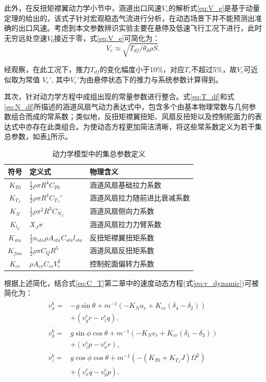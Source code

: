 此外，在反扭矩襟翼动力学小节中，涵道出口风速$V_e$的解析式\eqref{eq:V_e}是基于动量定理的给出的，该式子针对宏观稳态气流进行分析，在动态场景下并不能预测出准确的出口风速。考虑到本文参数辨识实验主要在悬停及低速飞行工况下进行，此时无穷远处空速$V_0$接近于零，式\eqref{eq:V_e}可简化为：
\begin{equation}
    V_e \approx \sqrt{T_{df}/\theta _d \rho S}.
\end{equation}

经观察，在此工况下，推力$T_{df}$的变化幅度小于10\%，对应$T_e$不超过5\%，故$V_e$可近似取为常值 $V_e'$, 其中$V_e'$为由悬停状态下的推力与系统参数计算得到。

其次，针对动力学方程中成组出现的常量参数进行整合。式\eqref{eq:T_df}和式\eqref{eq:N_df}所描述的涵道风扇气动力表达式中，包含多个由基本物理常数与几何参数组合而成的常系数；类似地，反扭矩襟翼扭矩、风扇反扭矩以及控制舵面力的表达式中亦存在此类组合。为使动态方程更加简洁清晰，将这些常系数定义为若干集总参数，如表\ref{tab:lumped_parameters}所示。

\begin{table}[htbp]
\centering
\caption{\label{tab:lumped_parameters}动力学模型中的集总参数定义}
\begin{tabular}{cll}
\toprule
符号 & 定义式 & 物理含义 \tabularnewline
\midrule
$K_{T0}$ & $ \frac{1}{2}\rho \pi R^4 C_{T0}$ \hfill & 涵道风扇基础拉力系数 \tabularnewline
$K_{T_J}$ & $ \frac{1}{2}\rho \pi R^4 C_{T_J}'$ \hfill & 涵道风扇拉力随前进比衰减系数 \tabularnewline
$K_{N}$ & $ \frac{1}{2}\rho \pi^2 R^3 C_{N_J}$ \hfill & 涵道风扇侧向力系数 \tabularnewline
$K_{l_T}$ & $ X_J \pi$ \hfill & 涵道风扇拉力力臂系数 \tabularnewline
$K_{sta}$ & $ \frac{1}{2} n_{sta} \rho A_{sta} C_{sta} l_{sta}$ \hfill & 反扭矩襟翼扭矩系数 \tabularnewline
$K_{fan}$ & $ \frac{1}{2}\rho \pi C_Q R^5$ \hfill & 涵道风扇反扭矩系数 \tabularnewline
$K_{cv}$ & $ \rho A_{cv} C_{cv} V_e^2$ \hfill & 控制舵面偏转力系数 \tabularnewline
\bottomrule
\end{tabular}
\end{table}

根据上述简化，结合式\eqref{eq:C_T}第二章中的速度动态方程(式\eqref{eq:v_dynamic})可被简化为：
\begin{equation}
    \begin{aligned}
        \dot{v_x^b} =& -g\sin\theta + m^{-1}(-K_{N} u_r + K_{cv} (\delta_4 - \delta_2)) \\
        &+ (v_y^e r - v_z^e q), \\
        \dot{v_y^b} =& g\sin\phi\cos\theta + m^{-1}(-K_{N} v_r + K_{cv} (\delta_1 - \delta_3)) \\
        &+ (v_z^e p - v_x^e r), \\
        \dot{v_z^b} =& g\cos\phi\cos\theta + m^{-1}(-(K_{T0} + K_{T_J}J) \Omega^2) \\
        &+ (v_x^e q - v_y^e p).
    \end{aligned}
    \label{eq:v_dynamic_sim}
\end{equation}

